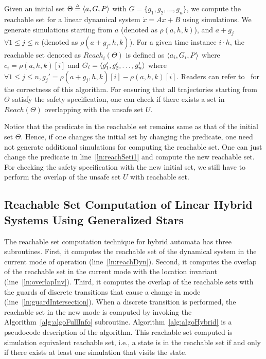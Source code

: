 Given an initial set $\Theta \deq \tup{a, G, P}$ with $G = \{g_1, g_2, \ldots, g_n\}$, we compute the reachable set for a linear dynamical system $\dot{x} = Ax + B$ using simulations.
%
We generate simulations starting from $a$ (denoted as $\rho(a, h, k)$), and $a+g_j$ $\forall 1\leq j \leq n$ (denoted as $\rho(a+g_j, h, k)$). 
%
For a given time instance $i\cdot h$, the reachable set denoted as $Reach_i(\Theta)$ is defined as $\tup{a_i, G_i, P}$ where $c_i = \rho(a, h, k)[i]$ and $G_i = \tup{g_1', g_2', \ldots, g_n'}$ where $\forall 1\leq j \leq n, g_j' = \rho(a+g_j, h, k)[i] - \rho(a, h, k)[i]$. 
%
Readers can refer to~\cite{bak2017tacas} for the correctness of this algorithm.
%
For ensuring that all trajectories starting from $\Theta$ satisfy the safety specification, one can check if there exists a set in $Reach(\Theta)$ overlapping with the unsafe set $U$.
%

\begin{remark}
\label{rem:predConst}
Notice that the predicate in the reachable set remains same as that of the initial set $\Theta$. Hence, if one changes the initial set by changing the predicate, one need not generate additional simulations for computing the reachable set. One can just change the predicate in line~\ref{ln:reachSeti1} and compute the new reachable set. For checking the safety specification with the new initial set, we still have to perform the overlap of the unsafe set $U$ with reachable set.
\end{remark}

\subsection{Reachable Set Computation of Linear Hybrid Systems Using Generalized Stars}
%
The reachable set computation technique for hybrid automata has three subroutines.
%
First, it computes the reachable set of the dynamical system in the current mode of operation (line~\ref{ln:reachDyn}).
%
Second, it computes the overlap of the reachable set in the current mode with the location invariant (line~\ref{ln:overlapInv}).
%
Third, it computes the overlap of the reachable sets with the guards of discrete transitions that cause a change in mode (line~\ref{ln:guardIntersection}).
%
When a discrete transition is performed, the reachable set in the new mode is computed by invoking the Algorithm~\ref{alg:algoFullInfo} subroutine.
%
Algorithm~\ref{alg:algoHybrid} is a pseudocode description of the algorithm. This reachable set computed is simulation equivalent reachable set, i.e., a state is in the reachable set if and only if there exists at least one simulation that visits the state.

